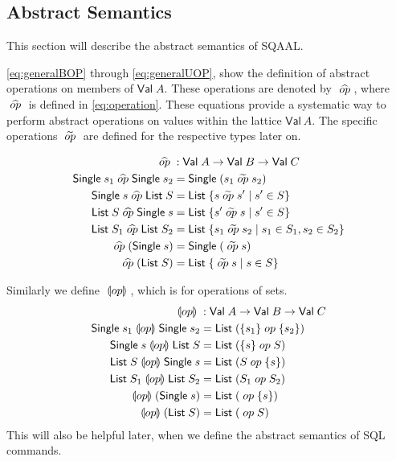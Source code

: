 \subsection{Abstract Semantics}\label{subsec:abstract-semantics}
This section will describe the abstract semantics of SQAAL.

\autoref{eq:generalBOP} through \ref{eq:generalUOP}, show the definition of abstract operations on members of $\mathsf{Val} \; A$.
These operations are denoted by $\;\widehat{op}\;$, where $\;\widehat{op}\;$ is defined in \autoref{eq:operation}.
These equations provide a systematic way to perform abstract operations on values within the lattice $\mathsf{Val} \ A$.
The specific operations $\;\widetilde{op}\;$ are defined for the respective types later on.

\begin{align}
    \aop &: \mathsf{Val} \; A \rightarrow \mathsf{Val} \; B \rightarrow \mathsf{Val} \; C \label{eq:operation} \\
    \mathsf{Single} \; s_1 \aop \mathsf{Single} \; s_2 &= \mathsf{Single} \; (s_1 \aaop s_2) \label{eq:generalBOP} \\
    \mathsf{Single} \; s \aop \mathsf{List} \; S &= \mathsf{List} \; \{ s \aaop s' \mid s' \in S \} \\
    \mathsf{List} \; S \aop \mathsf{Single} \; s &= \mathsf{List} \; \{ s' \aaop s \mid s' \in S \}  \\
    \mathsf{List} \; S_1 \aop \mathsf{List} \; S_2 &= \mathsf{List} \; \{ s_1 \aaop s_2 \mid s_1 \in S_1, s_2 \in S_2 \} \\
    \aop (\mathsf{Single} \; s) &= \mathsf{Single} \; (\aaop s) \\
    \aop (\mathsf{List} \; S) &= \mathsf{List} \; \{ \aaop s \mid s \in S \} \label{eq:generalUOP}
\end{align}

Similarly we define $\;\llparenthesis op\rrparenthesis\;$, which is for operations of sets.
\begin{align}
    \;\llparenthesis op\rrparenthesis\; &: \mathsf{Val} \; A \rightarrow \mathsf{Val} \; B \rightarrow \mathsf{Val} \; C \\
    \mathsf{Single} \; s_1 \;\llparenthesis op\rrparenthesis\; \mathsf{Single} \; s_2 &= \mathsf{List} \; (\{s_1\} \;op\; \{s_2\}) \\
    \mathsf{Single} \; s \;\llparenthesis op\rrparenthesis\; \mathsf{List} \; S &= \mathsf{List} \; (\{ s \} \;op\; S) \\
    \mathsf{List} \; S \;\llparenthesis op\rrparenthesis\; \mathsf{Single} \; s &= \mathsf{List} \; (S \;op\; \{ s \})  \\
    \mathsf{List} \; S_1 \;\llparenthesis op\rrparenthesis\; \mathsf{List} \; S_2 &= \mathsf{List} \; (S_1 \;op\; S_2) \\
    \;\llparenthesis op\rrparenthesis\; (\mathsf{Single} \; s) &= \mathsf{List} \; (\;op\; \{ s \}) \\
    \;\llparenthesis op\rrparenthesis\; (\mathsf{List} \; S) &= \mathsf{List} \; (\;op\; S )
\end{align}
This will also be helpful later, when we define the abstract semantics of SQL commands.

